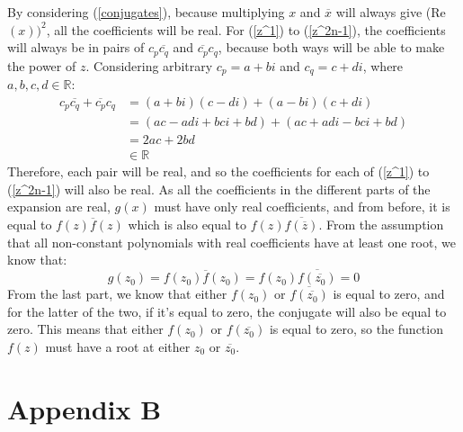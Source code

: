 \documentclass{article}
\begin{document}
By considering (\ref{conjugates}), because multiplying \(x\) and \(\overline{x}\) will always give (Re\((x))^2\), all the coefficients will be real. For (\ref{z^1}) to (\ref{z^2n-1}), the coefficients will always be in pairs of \(c_p\overline{c_q}\) and \(\overline{c_p}c_q\), because both ways will be able to make the power of \(z\). Considering arbitrary \(c_p = a+bi\) and \(c_q=c+di\), where \(a,b,c,d \in \mathbb{R}\):
\begin{align*}
    c_p\overline{c_q} + \overline{c_p}c_q &= (a+bi)(c-di) + (a-bi)(c+di) \\
    &= (ac - adi + bci + bd) + (ac + adi - bci + bd)\\
    &= 2ac + 2bd \\
    &\in \mathbb{R}
\end{align*}
Therefore, each pair will be real, and so the coefficients for each of (\ref{z^1}) to (\ref{z^2n-1}) will also be real. As all the coefficients in the different parts of the expansion are real, \(g(x)\) must have only real coefficients, and from before, it is equal to \(f(z)\overline{f}(z)\) which is also equal to \(f(z)\overline{f(\overline{z})}\). From the assumption that all non-constant polynomials with real coefficients have at least one root, we know that:
\[g(z_0) = f(z_0)\overline{f}(z_0) = f(z_0)\overline{f(\overline{z_0})} = 0\]
From the last part, we know that either \(f(z_0)\) or \(\overline{f(\overline{z_0})}\) is equal to zero, and for the latter of the two, if it's equal to zero, the conjugate will also be equal to zero. This means that either \(f(z_0)\) or \(f(\overline{z_0})\) is equal to zero, so the function \(f(z)\) must have a root at either \(z_0\) or \(\overline{z_0}\).

\newpage
\section*{Appendix B}
\end{document}
